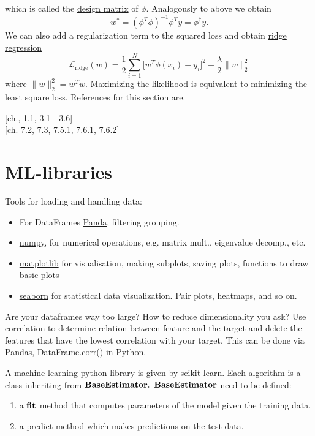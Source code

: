 \documentclass[12 pt]{article}        	%
\begin{document}
which is called the \underline{design matrix} of $ \phi $.
Analogously to above we obtain 
\[
    w^* = ( \phi^T \phi )^{ - 1 } \phi^T y = \phi^{ \dagger } y .
\]
We can also add a regularization term to the squared loss and obtain \underline{ridge regression}
\[
    \mathcal{ L }_{ \text{ridge} } ( w ) 
    =
    \frac{ 1 }{ 2 } \sum_{ i = 1 }^N \big[ w^T \phi ( x_i ) - y_i \big]^2 + \frac{ \lambda }{ 2 } \lVert w \rVert^2_2
\]
where $ \lVert w \rVert_2^2 = w^T w $.
Maximizing the likelihood is equivalent to minimizing the least square loss.
References for this section are.
\begin{center}
    \cite{Pattern_recognition_machine_learning}[ch., 1.1, 3.1 - 3.6]
    \\
    \cite{pml1Book}[ch. 7.2, 7.3, 7.5.1, 7.6.1, 7.6.2]
\end{center}


\section{ML-libraries}
Tools for loading and handling data:
\begin{itemize}
    \item 
    For DataFrames \underline{Panda}, filtering grouping.   

    \item 
    \underline{numpy}, for numerical operations, e.g. matrix mult., eigenvalue decomp., etc.

    \item 
    \underline{matplotlib} for visualisation, making subplots, saving plots, functions to draw basic plots

    \item 
    \underline{seaborn} for statistical data visualization. Pair plots, heatmaps, and so on.
\end{itemize}

Are your dataframes way too large?
How to reduce dimensionality you ask?
Use correlation to determine relation between feature and the target 
and delete the features that have the lowest correlation with your target.
This can be done via Pandas, DataFrame.corr() in Python.

A machine learning python library is given by \underline{scikit-learn}.
Each algorithm is a class inheriting from $\bold{BaseEstimator}.$
$\bold{BaseEstimator}$ need to be defined:
\begin{enumerate}
    \item 
    a $\bold{fit}$ method that computes parameters of the model given the training data.

    \item 
    a predict method which makes predictions on the test data.
\end{enumerate}
\end{document}
